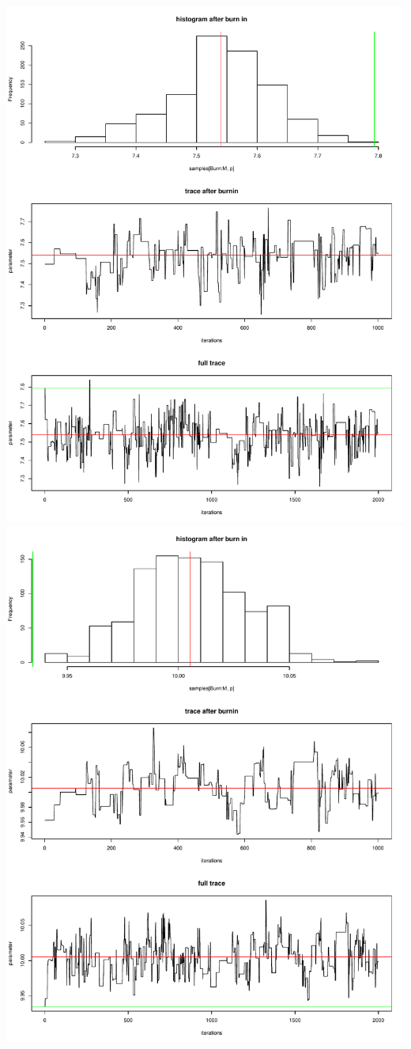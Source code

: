 \documentclass[a4paper,12pt]{scrartcl} %
\begin{document}
\includegraphics[scale=0.4]{3}
\includegraphics[scale=0.4]{4}
\end{document}
